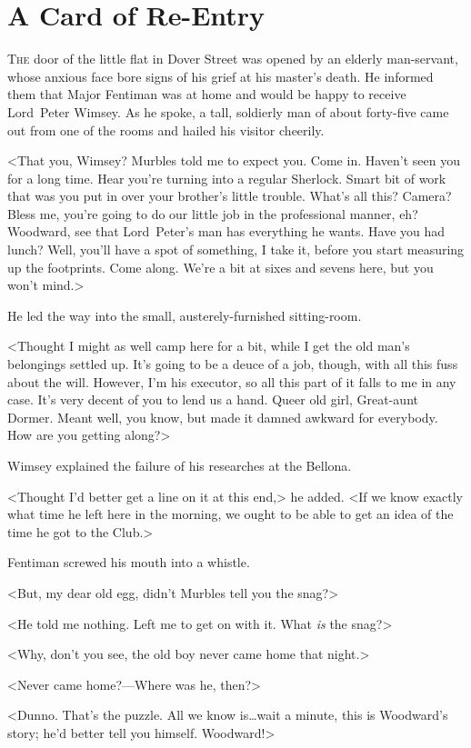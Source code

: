 \chapter{A Card of Re-Entry}
\lettrine{T}{he} door of the little flat in Dover Street was opened by an elderly man-servant, whose anxious face bore signs of his grief at his master's death. He informed them that Major Fentiman was at home and would be happy to receive Lord~Peter Wimsey. As he spoke, a tall, soldierly man of about forty-five came out from one of the rooms and hailed his visitor cheerily.

<That you, Wimsey? Murbles told me to expect you. Come in. Haven't seen you for a long time. Hear you're turning into a regular Sherlock. Smart bit of work that was you put in over your brother's little trouble. What's all this? Camera? Bless me, you're going to do our little job in the professional manner, eh? Woodward, see that Lord~Peter's man has everything he wants. Have you had lunch? Well, you'll have a spot of something, I take it, before you start measuring up the footprints. Come along. We're a bit at sixes and sevens here, but you won't mind.>

He led the way into the small, austerely-furnished sitting-room.

<Thought I might as well camp here for a bit, while I get the old man's belongings settled up. It's going to be a deuce of a job, though, with all this fuss about the will. However, I'm his executor, so all this part of it falls to me in any case. It's very decent of you to lend us a hand. Queer old girl, Great-aunt Dormer. Meant well, you know, but made it damned awkward for everybody. How are you getting along?>

Wimsey explained the failure of his researches at the Bellona.

<Thought I'd better get a line on it at this end,> he added. <If we know exactly what time he left here in the morning, we ought to be able to get an idea of the time he got to the Club.>

Fentiman screwed his mouth into a whistle.

<But, my dear old egg, didn't Murbles tell you the snag?>

<He told me nothing. Left me to get on with it. What \emph{is} the snag?>

<Why, don't you see, the old boy never came home that night.>

<Never came home?—Where was he, then?>

<Dunno. That's the puzzle. All we know is\dots  wait a minute, this is Woodward's story; he'd better tell you himself. Woodward!>

